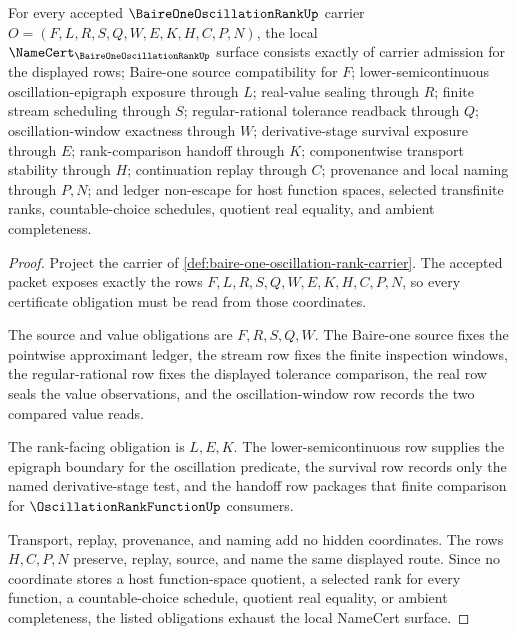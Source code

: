 \begin{theorem}
\label{thm:baire-one-oscillation-rank-namecert-obligations}
For every accepted $\BaireOneOscillationRankUp$ carrier $O=(F,L,R,S,Q,W,E,K,H,C,P,N)$, the local $\NameCert_{\BaireOneOscillationRankUp}$ surface consists exactly of carrier admission for the displayed rows; Baire-one source compatibility for $F$; lower-semicontinuous oscillation-epigraph exposure through $L$; real-value sealing through $R$; finite stream scheduling through $S$; regular-rational tolerance readback through $Q$; oscillation-window exactness through $W$; derivative-stage survival exposure through $E$; rank-comparison handoff through $K$; componentwise transport stability through $H$; continuation replay through $C$; provenance and local naming through $P,N$; and ledger non-escape for host function spaces, selected transfinite ranks, countable-choice schedules, quotient real equality, and ambient completeness.
\end{theorem}
\begin{proof}
Project the carrier of \autoref{def:baire-one-oscillation-rank-carrier}. The accepted packet exposes exactly the rows $F,L,R,S,Q,W,E,K,H,C,P,N$, so every certificate obligation must be read from those coordinates.

The source and value obligations are $F,R,S,Q,W$. The Baire-one source fixes the pointwise approximant ledger, the stream row fixes the finite inspection windows, the regular-rational row fixes the displayed tolerance comparison, the real row seals the value observations, and the oscillation-window row records the two compared value reads.

The rank-facing obligation is $L,E,K$. The lower-semicontinuous row supplies the epigraph boundary for the oscillation predicate, the survival row records only the named derivative-stage test, and the handoff row packages that finite comparison for $\OscillationRankFunctionUp$ consumers.

Transport, replay, provenance, and naming add no hidden coordinates. The rows $H,C,P,N$ preserve, replay, source, and name the same displayed route. Since no coordinate stores a host function-space quotient, a selected rank for every function, a countable-choice schedule, quotient real equality, or ambient completeness, the listed obligations exhaust the local NameCert surface.
\end{proof}

